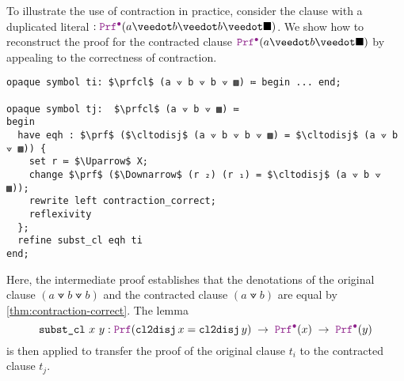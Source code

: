 \begin{example}[Contraction]
To illustrate the use of contraction in practice, consider the clause with a duplicated literal $: \prfcl (a \veedot b \veedot b \veedot \nil)$.
We show how to reconstruct the proof for the contracted clause $\prfcl (a \veedot b \veedot \nil)$ by appealing to the correctness of contraction.

\begin{lstlisting}[language=Lambdapi,mathescape=true,]
opaque symbol ti: $\prfcl$ (a ⟇ b ⟇ b ⟇ ▩) ≔ begin ... end;

opaque symbol tj:  $\prfcl$ (a ⟇ b ⟇ ▩) ≔
begin
  have eqh : $\prf$ ($\cltodisj$ (a ⟇ b ⟇ b ⟇ ▩) = $\cltodisj$ (a ⟇ b ⟇ ▩)) {
    set r ≔ $\Uparrow$ X;
    change $\prf$ ($\Downarrow$ (r ₂) (r ₁) = $\cltodisj$ (a ⟇ b ⟇ ▩));
    rewrite left contraction_correct;
    reflexivity
  };
  refine subst_cl eqh ti
end;
\end{lstlisting}
Here, the intermediate proof  establishes that the denotations of the original clause
$(a \veedot b \veedot b)$ and the contracted clause $(a \veedot b)$ are equal by \cref{thm:contraction-correct}.
The lemma
\[
  \kw{subst\_cl}~x~y: 
    \prf(\cltodisj\,x = \cltodisj\,y)
    \;\ra\; \prfcl(x) \;\ra\; \prfcl(y)
\]
is then applied to transfer the proof of the original clause $t_i$ to the contracted clause $t_j$.
\end{example}